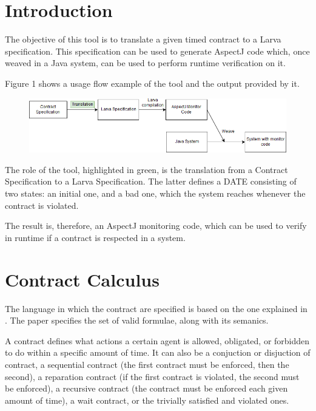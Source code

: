 \documentclass{article}
\begin{document}
\section{Introduction}

The objective of this tool is to translate a given timed contract to a Larva specification. This specification can be used to generate AspectJ code which, once weaved in a Java system, can be used to perform runtime verification on it.

Figure 1 shows a usage flow example of the tool and the output provided by it.

\begin{figure}[hp]
  \centering
  \includegraphics[scale=0.5]{Larva-rt-tutorial.png}
\end{figure}

The role of the tool, highlighted in green, is the translation from a Contract Specification to a Larva Specification. The latter defines a DATE consisting of two states: an initial one, and a bad one, which the system reaches whenever the contract is violated.

The result is, therefore, an AspectJ monitoring code, which can be used to verify in runtime if a contract is respected in a system.

\section{Contract Calculus}

The language in which the contract are specified is based on the one explained in \cite{untimed}. The paper specifies the set of valid formulae, along with its semanics.

A contract defines what actions a certain agent is allowed, obligated, or forbidden to do within a specific amount of time. It can also be a conjuction or disjuction of contract, a sequential contract (the first contract must be enforced, then the second), a reparation contract (if the first contract is violated, the second must be enforced), a recursive contract (the contract must be enforced each given amount of time), a wait contract, or the trivially satisfied and violated ones.
\end{document}
